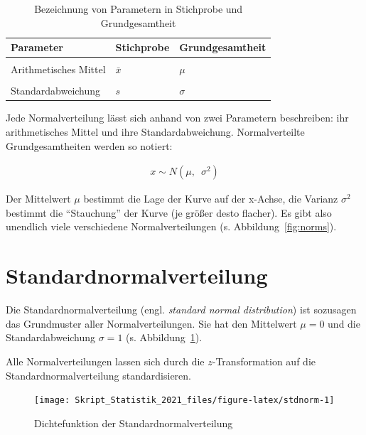 \documentclass[
  11pt,
  ngerman,
  a4paper,
]{report}
\begin{document}
\begin{table}

\caption{\label{tab:param}Bezeichnung von Parametern in Stichprobe und Grundgesamtheit}
\centering
\begin{tabular}[t]{lll}
\toprule
\textbf{Parameter} & \textbf{Stichprobe} & \textbf{Grundgesamtheit}\\
\midrule
\cellcolor{gray!6}{Anzahl Elemente} & \cellcolor{gray!6}{$n$} & \cellcolor{gray!6}{$N$}\\
Arithmetisches Mittel & $\bar{x}$ & $\mu$\\
\cellcolor{gray!6}{Varianz} & \cellcolor{gray!6}{$s^2$} & \cellcolor{gray!6}{$\sigma^2$}\\
Standardabweichung & $s$ & $\sigma$\\
\bottomrule
\end{tabular}
\end{table}

Jede Normalverteilung lässt sich anhand von zwei Parametern beschreiben: ihr arithmetisches Mittel und ihre Standardabweichung. Normalverteilte Grundgesamtheiten werden so notiert:

\nopagebreak

\[\begin{aligned}
x \sim N(\mu,\enspace\sigma^2)
\end{aligned}
\label{eq:norm}\]

Der Mittelwert \(\mu\) bestimmt die Lage der Kurve auf der x-Achse, die Varianz \(\sigma^2\) bestimmt die \enquote{Stauchung} der Kurve (je größer desto flacher). Es gibt also unendlich viele verschiedene Normalverteilungen (s. Abbildung~\ref{fig:norms}).

\hypertarget{standardnormalverteilung}{%
\section{Standardnormalverteilung}\label{standardnormalverteilung}}

Die Standardnormalverteilung (engl. \emph{standard normal distribution}) ist sozusagen das Grundmuster aller Normalverteilungen. Sie hat den Mittelwert \(\mu=0\) und die Standardabweichung \(\sigma=1\) (s. Abbildung~\ref{fig:stdnorm}).

Alle Normalverteilungen lassen sich durch die \(z\)-Transformation auf die Standardnormalverteilung standardisieren.

\begin{figure}[!h]

{\centering \texttt{[image: Skript\_Statistik\_2021\_files/figure-latex/stdnorm-1]} 

}

\caption{Dichtefunktion der Standardnormalverteilung}\label{fig:stdnorm}
\end{figure}
\end{document}
